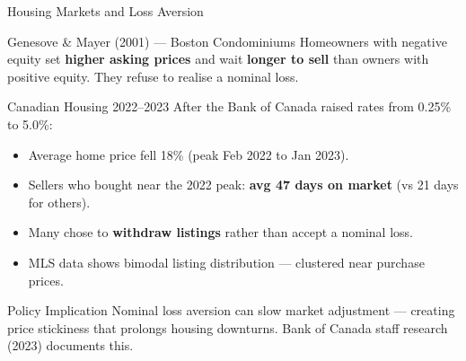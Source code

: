 \documentclass[aspectratio=169]{beamer}
\begin{document}
\begin{frame}{Housing Markets and Loss Aversion}
\begin{block}{Genesove \& Mayer (2001) --- Boston Condominiums}
\small Homeowners with negative equity set \textbf{higher asking prices} and wait \textbf{longer to sell} than owners with positive equity. They refuse to realise a nominal loss.
\end{block}
\begin{exampleblock}{Canadian Housing 2022--2023}
\small After the Bank of Canada raised rates from 0.25\% to 5.0\%:
\begin{itemize}\setlength{\itemsep}{0pt}
  \item Average home price fell 18\% (peak Feb 2022 to Jan 2023).
  \item Sellers who bought near the 2022 peak: \textbf{avg 47 days on market} (vs 21 days for others).
  \item Many chose to \textbf{withdraw listings} rather than accept a nominal loss.
  \item MLS data shows bimodal listing distribution --- clustered near purchase prices.
\end{itemize}
\end{exampleblock}
\begin{alertblock}{Policy Implication}
\small Nominal loss aversion can slow market adjustment --- creating price stickiness that prolongs housing downturns. Bank of Canada staff research (2023) documents this.
\end{alertblock}
\end{frame}
\end{document}
